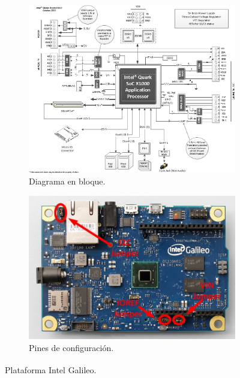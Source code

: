 \documentclass[11pt,oneside,spanish,a4paper]{article}
\begin{document}
\begin{figure}[h]
  \centering
  \begin{subfigure}{0.55\textwidth}
    \centering
    \includegraphics[width=\textwidth]{img/galileo.png}
    \caption{Diagrama en bloque.}
    \label{fig:sch-galileo}
  \end{subfigure}
  \hfill
  \begin{subfigure}{0.4\textwidth}
    \centering
    \includegraphics[width=\textwidth]{img/galileo-front}
    \caption{Pines de configuración.}
    \label{fig:galileo-config}
  \end{subfigure}

  \caption{Plataforma Intel\textsuperscript{\textregistered{}} Galileo.}
  \label{fig:galileo}
\end{figure}
\end{document}
